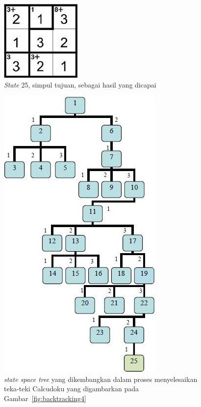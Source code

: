 \documentclass[a4paper,twoside]{article}
\begin{document}
\begin{enumerate}
\begin{enumerate}
\begin{figure}
\centering
\captionsetup{justification=centering}
\includegraphics[scale=1]{Gambar/Backtracking7}
\caption[\textit{State} 25, simpul tujuan, sebagai hasil yang dicapai  ~\cite{Fahda}]{\textit{State} 25, simpul tujuan, sebagai hasil yang dicapai  ~\cite{Fahda}}
\label{fig:backtracking7}
\end{figure}

\end{enumerate}

\begin{figure}
\centering
\captionsetup{justification=centering}
\includegraphics[scale=1]{Gambar/Backtracking8}
\caption[\textit{state space tree} yang dikembangkan dalam proses menyelesaikan teka-teki Calcudoku yang digambarkan pada  Gambar~\ref{fig:backtracking4}  ~\cite{Fahda}]{\textit{state space tree} yang dikembangkan dalam proses menyelesaikan teka-teki Calcudoku yang digambarkan pada  Gambar~\ref{fig:backtracking4}  ~\cite{Fahda}}
\label{fig:backtracking8}
\end{figure}


\end{enumerate}
\end{document}
